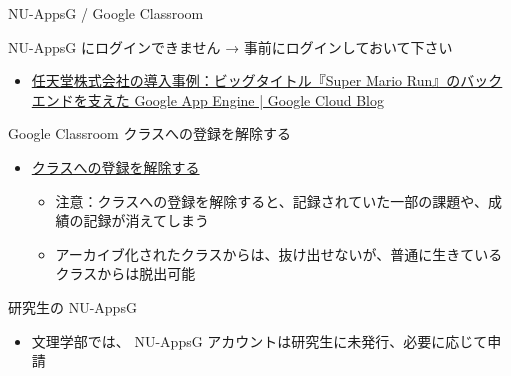 \documentclass[a4j,10pt]{jsarticle}
\def\lthtmlcheckvsize{\ifdim\ht\sizebox<\vsize 
  \ifdim\wd\sizebox<\hsize\expandafter\hfill\fi \expandafter\vfill
  \else\expandafter\vss\fi}%
\begin{document}
{\begin{frame}[label={sec:org25495ab},fragile]{NU-AppsG / Google Classroom}
\begin{block}{NU-AppsG にログインできません → 事前にログインしておいて下さい}
\begin{itemize}
\begin{itemize}
\item \href{https://cloud.google.com/blog/ja/topics/customers/super-mario-run-google-app-engine}{任天堂株式会社の導入事例：ビッグタイトル『Super Mario Run』のバックエンドを支えた Google App Engine | Google Cloud Blog}
\end{itemize}
\end{itemize}
\end{block}
\par
\begin{block}{Google Classroom クラスへの登録を解除する}
\begin{itemize}
\item \href{https://support.google.com/edu/classroom/answer/6069981?co=GENIE.Platform\%3DDesktop\&hl=ja}{クラスへの登録を解除する}
\begin{itemize}
\item 注意：クラスへの登録を解除すると、記録されていた一部の課題や、成績の記録が消えてしまう
\item アーカイブ化されたクラスからは、抜け出せないが、普通に生きているクラスからは脱出可能
\end{itemize}
\end{itemize}
\end{block}
\par
\begin{block}{研究生の NU-AppsG}
\begin{itemize}
\item 文理学部では、 NU-AppsG アカウントは研究生に未発行、必要に応じて申請
\end{itemize}
\end{block}
\end{frame}%
\lthtmlfigureZ
\lthtmlcheckvsize\clearpage}
\end{document}
